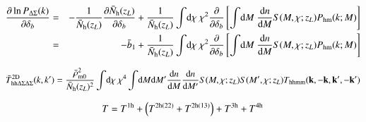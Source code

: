 \documentclass[onecolumn,notitlepage,showpacs,amsmath,amssymb,prd,floatfix]{revtex4-1}
\newcommand{\bk}{{\bf k}}
\newcommand{\dr}{\mathrm{d}}
\newcommand{\bh}{\mathrm{h}}
\newcommand{\dsigma}{\Delta\Sigma}
\begin{document}
\begin{eqnarray}
\frac{\partial \ln P_{\dsigma}(k)}{\partial
 \delta_b}&=&-\frac{1}{\bar{N}_\bh(z_L)}\frac{\partial
 \bar{N}_\bh(z_L)}{\partial \delta_b}+
 \frac{1}{\bar{N}_\bh(z_L)}\int\!\dr\chi~\chi^2
 \frac{\partial }{\partial
 \delta_b}\left[\int\!\dr M~\frac{\dr n}{\dr M}S(M,\chi;z_L)P_{\rm
	   hm}(k;M)\right]\nonumber\\
 &=& -\bar{b}_1+\frac{1}{\bar{N}_\bh(z_L)}\int\!\dr\chi~\chi^2
 \frac{\partial }{\partial
 \delta_b}\left[\int\!\dr M~\frac{\dr n}{\dr M}S(M,\chi;z_L)P_{\rm
	   hm}(k;M)\right]\nonumber\\
\end{eqnarray}

\begin{equation}
 \bar{T}^{\rm 2D}_{{\rm hh}\dsigma\dsigma}(k,k')
  =\frac{\bar{\rho}_{\rm m0}^2}{\bar{N}_\bh(z_L)^2}
  \int\!\dr\chi~\chi^4\int\!\dr M\dr M'\frac{\dr n}{\dr M}\frac{\dr n}{\dr M'}S(M,\chi;z_L)S(M',\chi;z_L)
T_{{\rm hhmm}}(\bk,-\bk,\bk',-\bk')
\end{equation}

\begin{equation}
T=T^{\rm 1h}+\left(T^{\rm 2h(22)}+T^{\rm 2h(13)}\right)+T^{\rm
 3h}+T^{\rm 4h}
\end{equation}
\end{document}
